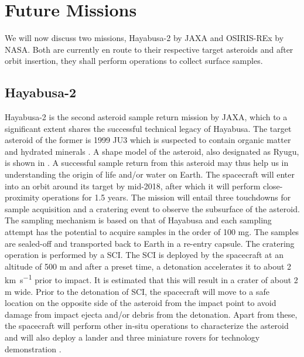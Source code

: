\section{Future Missions}
\label{sec:future_missions}
We will now discuss two missions, Hayabusa-2 by \gls{JAXA} and \gls{OSIRIS-REx} by \gls{NASA}. Both are currently en route to their respective target asteroids and after orbit insertion, they shall perform operations to collect surface samples.

\subsection{Hayabusa-2}
\label{subsec:hayabusa2_heritage}
Hayabusa-2 is the second asteroid sample return mission by \gls{JAXA}, which to a significant extent shares the successful technical legacy of Hayabusa. The target asteroid of the former is 1999 JU3 which is suspected to contain organic matter and hydrated minerals \parencite{TsudaHayabusa2SystemDesign}. A shape model of the asteroid, also designated as Ryugu, is shown in  \parencite{ryuguShapeModel}. A successful sample return from this asteroid may thus help us in understanding the origin of life and/or water on Earth. The spacecraft will enter into an orbit around its target by mid-2018, after which it will perform close-proximity operations for 1.5 years. The mission will entail three touchdowns for sample acquisition and a cratering event to observe the subsurface of the asteroid. The sampling mechanism is based on that of Hayabusa and each sampling attempt has the potential to acquire samples in the order of 100 \si{\milli\gram}. The samples are sealed-off and transported back to Earth in a re-entry capsule. The cratering operation is performed by a \gls{SCI}. The \gls{SCI} is deployed by the spacecraft at an altitude of 500 \si{\metre} and after a preset time, a detonation accelerates it to about 2 \si{\kilo\metre\per\second} prior to impact. It is estimated that this will result in a crater of about 2 \si{\metre} wide. Prior to the detonation of \gls{SCI}, the spacecraft will move to a safe location on the opposite side of the asteroid from the impact point to avoid damage from impact ejecta and/or debris from the detonation. Apart from these, the spacecraft will perform other in-situ operations to characterize the asteroid and will also deploy a lander and three miniature rovers for technology demonstration \parencite{TsudaHayabusa2SystemDesign}.
